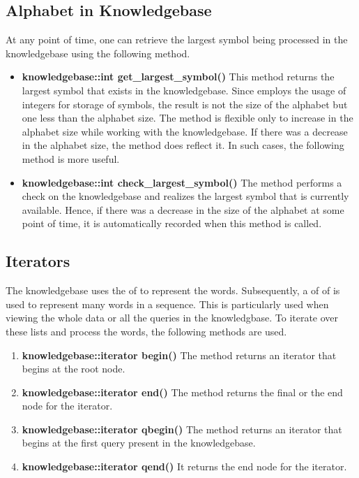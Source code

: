 \subsection*{Alphabet in Knowledgebase}
At any point of time, one can retrieve the largest symbol being processed in the knowledgebase using the following method.
\begin{itemize}
\item \textbf{knowledgebase::int get\_largest\_symbol()} \vskip 1pt 
This method returns the largest symbol that exists in the knowledgebase. Since \libalf employs the usage of integers for storage of symbols, the result is not the size of the alphabet but one less than the alphabet size. The method is flexible only to increase in the alphabet size while working with the knowledgebase. If there was a decrease in the alphabet size, the method does reflect it. In such cases, the following method is more useful.
\item \textbf{knowledgebase::int check\_largest\_symbol()} \hfill \vskip 1pt
The method performs a check on the knowledgebase and realizes the largest symbol that is currently available. Hence, if there was a decrease in the size of the alphabet at some point of time, it is automatically recorded when this method is called.
\end{itemize}	

\subsection*{Iterators}

The knowledgebase uses the \lists of \integer to represent the words. Subsequently, a \lists of \lists of \integer is used to represent many words in a sequence. This is particularly used when viewing the whole data or all the queries in the knowledgbase. To iterate over these lists and process the words, the following methods are used. 

\begin{enumerate}
\item \textbf{knowledgebase::iterator begin()} \vskip 1pt
	The method returns an iterator that begins at the root node.

\item \textbf{knowledgebase::iterator end()} \vskip 1pt
	The method returns the final or the end node for the iterator.
	 
\item \textbf{knowledgebase::iterator qbegin()} \vskip 1pt
	The method returns an iterator that begins at the first query present in the knowledgebase.
	
\item \textbf{knowledgebase::iterator qend()} \vskip 1pt
	It returns the end node for the iterator.
\end{enumerate}

